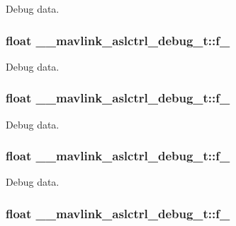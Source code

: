 Debug data. 

\hypertarget{struct____mavlink__aslctrl__debug__t_a756a17218b77ac6f82100e1273044f18}{
\subsubsection[{f\+\_\+2}]{\setlength{\rightskip}{0pt plus 5cm}float \+\_\+\+\_\+mavlink\+\_\+aslctrl\+\_\+debug\+\_\+t\+::f\+\_}}\label{struct____mavlink__aslctrl__debug__t_a756a17218b77ac6f82100e1273044f18}


Debug data. 

\hypertarget{struct____mavlink__aslctrl__debug__t_a7f939a1006fe709dd8f549a072901964}{
\subsubsection[{f\+\_\+3}]{\setlength{\rightskip}{0pt plus 5cm}float \+\_\+\+\_\+mavlink\+\_\+aslctrl\+\_\+debug\+\_\+t\+::f\+\_}}\label{struct____mavlink__aslctrl__debug__t_a7f939a1006fe709dd8f549a072901964}


Debug data. 

\hypertarget{struct____mavlink__aslctrl__debug__t_adda7ef6bbf4a60e1e4c6e4c197978df0}{
\subsubsection[{f\+\_\+4}]{\setlength{\rightskip}{0pt plus 5cm}float \+\_\+\+\_\+mavlink\+\_\+aslctrl\+\_\+debug\+\_\+t\+::f\+\_}}\label{struct____mavlink__aslctrl__debug__t_adda7ef6bbf4a60e1e4c6e4c197978df0}


Debug data. 

\hypertarget{struct____mavlink__aslctrl__debug__t_ad48835f355421536d40607cd40a415bd}{
\subsubsection[{f\+\_\+5}]{\setlength{\rightskip}{0pt plus 5cm}float \+\_\+\+\_\+mavlink\+\_\+aslctrl\+\_\+debug\+\_\+t\+::f\+\_}}\label{struct____mavlink__aslctrl__debug__t_ad48835f355421536d40607cd40a415bd}


